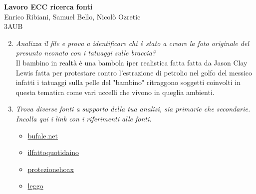 \documentclass[12pt]{article}
\begin{document}
\begin{center}

\vspace{2\baselineskip}

\vfill

\Huge{\textbf{Lavoro ECC ricerca fonti
}}\\
\vskip 3cm
\LARGE Enrico Ribiani, Samuel Bello, Nicolò Ozretic\\
\vskip 2mm
\Large 3AUB\\
\vskip 5cm
\end{center}
\begin{flushleft}
    \begin{enumerate}
        \setcounter{enumi}{1}
        \item \textit{Analizza il file e prova a identificare chi è stato a creare la foto originale del
        presunto neonato con i tatuaggi sulle braccia?}\\
        \vskip 1mm
        Il bambino in realtà è una bambola iper realistica fatta fatta da Jason Clay Lewis fatta per protestare contro l’estrazione di 
        petrolio nel golfo del messico infatti i  tatuaggi sulla pelle del "bambino" ritraggono soggetti coinvolti in questa tematica come vari uccelli che vivono in queglia ambienti.\\
        \item \textit{Trova diverse fonti a supporto della tua analisi, sia primarie che secondarie.
        Incolla qui i link con i riferimenti alle fonti.}
        \vskip 1mm
        \begin{itemize}
            
            \item \href{https://www.butac.it/bufala-madre-tatua-figlio-9-mesi/}{bufale.net}
            \item \href{http://www.ilfattoquotidaino.it/milano-madre-tatua-figlio-8-mesi-scatta-la-polemica/}{ilfattoquotidaino}
            \item \href{https://www.protezionehoax.com/2012/01/bufala-fa-tatuare-figlioletto-di-9-mesi.html}{protezionehoax}
            \item \href{https://www.leggo.it/news/esteri/tatua_figlio_di_nove_mesi_arrestata_foto-195563.html}{leggo}
        \end{itemize}
    \end{enumerate}
\end{flushleft}
\end{document}
